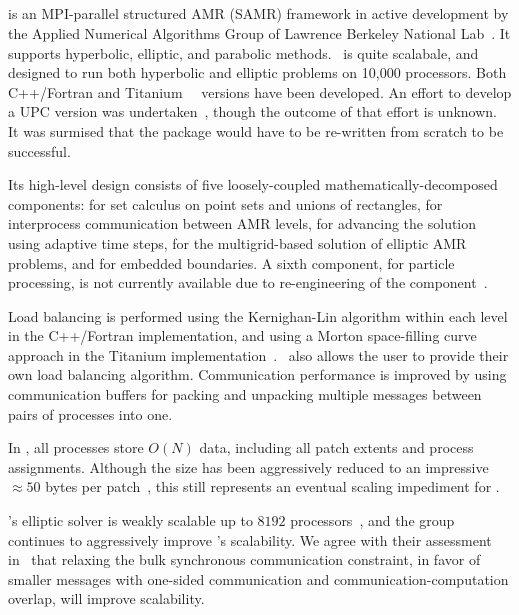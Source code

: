 \documentclass[10pt,twocolumn]{article}
\begin{document}
\subsection{\chombo} \label{ss:chombo}

\chombo is an MPI-parallel structured AMR (SAMR) framework in active
development by the Applied Numerical Algorithms Group of Lawrence
Berkeley National Lab~\nocite{CoGr09}.  It supports hyperbolic,
elliptic, and parabolic methods.  \chombo\ is quite scalabale, and
designed to run both hyperbolic and elliptic problems on 10,000
processors.  Both C++/Fortran and
Titanium~\cite{wwwtitanium}~\cite{YeSe98} versions have been
developed.  An effort to develop a UPC version was
undertaken~\cite{We04}, though the outcome of that effort is unknown.
It was surmised that the package would have to be re-written from
scratch to be successful.

Its high-level design consists of five loosely-coupled
mathematically-decomposed components:  for set calculus
on point sets and unions of rectangles,  for
interprocess communication between AMR levels, 
for advancing the solution using adaptive time steps,
 for the multigrid-based solution of elliptic AMR
problems, and  for embedded boundaries.  A sixth
component,  for particle processing, is not
currently available due to re-engineering of the
component~\cite{wwwchombo}.

Load balancing is performed using the Kernighan-Lin algorithm within
each level in the C++/Fortran implementation, and using a Morton
space-filling curve approach in the Titanium
implementation~\cite{WeSu07}.  \chombo\ also allows the user to
provide their own load balancing algorithm.  Communication performance
is improved by using communication buffers for packing and unpacking
multiple messages between pairs of processes into one.

In \chombo, all processes store $O(N)$
data, including all patch extents and process assignments.  Although
the size has been aggressively reduced to an impressive $\approx 50$
bytes per patch~\cite{CoKe07}, this still represents an eventual
scaling impediment for \chombo.

\chombo's elliptic solver is weakly scalable up to $8192$
processors~\cite{WeSu07}, and the group continues to aggressively
improve \chombo's scalability.  We agree with their assessment
in~\cite{WeSu07} that relaxing the bulk synchronous communication
constraint, in favor of smaller messages with one-sided communication
and communication-computation overlap, will improve scalability.
\end{document}
